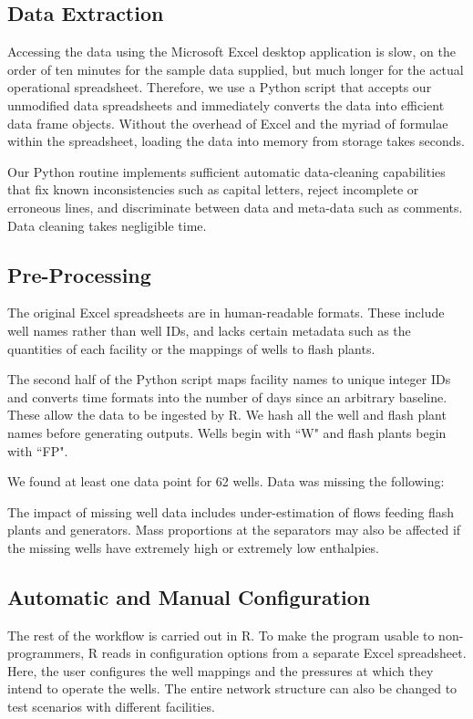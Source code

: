 \documentclass[a4paper, 12pt]{article}
\begin{document}
\subsection{Data Extraction}
Accessing the data using the Microsoft Excel desktop application is slow, on the order of ten minutes for the sample data supplied, but much longer for the actual operational spreadsheet. Therefore, we use a Python script that accepts our unmodified data spreadsheets and immediately converts the data into efficient data frame objects. Without the overhead of Excel and the myriad of formulae within the spreadsheet, loading the data into memory from storage takes seconds.

Our Python routine implements sufficient automatic data-cleaning capabilities that fix known inconsistencies such as capital letters, reject incomplete or erroneous lines, and discriminate between data and meta-data such as comments. Data cleaning takes negligible time.

\subsection{Pre-Processing}
The original Excel spreadsheets are in human-readable formats. These include well names rather than well IDs, and lacks certain metadata such as the quantities of each facility or the mappings of wells to flash plants.

The second half of the Python script maps facility names to unique integer IDs and converts time formats into the number of days since an arbitrary baseline. These allow the data to be ingested by R. We hash all the well and flash plant names before generating outputs. Wells begin with ``W" and flash plants begin with ``FP".

We found at least one data point for 62 wells. Data was missing the following:


The impact of missing well data includes under-estimation of flows feeding flash plants and generators. Mass proportions at the separators may also be affected if the missing wells have extremely high or extremely low enthalpies.

\subsection{Automatic and Manual Configuration}
The rest of the workflow is carried out in R. To make the program usable to non-programmers, R reads in configuration options from a separate Excel spreadsheet. Here, the user configures the well mappings and the pressures at which they intend to operate the wells. The entire network structure can also be changed to test scenarios with different facilities.
\end{document}
